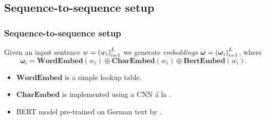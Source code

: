 \documentclass[8pt]{beamer}
\theoremstyle{definition}
\theoremstyle{plain}
\theoremstyle{definition}
\theoremstyle{remark}
\numberwithin{equation}{section}
\numberwithin{figure}{section}
\numberwithin{table}{section}
\begin{document}
\subsection{Sequence-to-sequence setup}
\begin{frame}
    \frametitle{Sequence-to-sequence setup}
    Given an input sentence \(w = \qty(w_{i})_{i=1}^{L}\) we generate \textit{embeddings} \(\boldsymbol{\omega} = \qty(\boldsymbol{\omega}_{i})_{i=1}^{L}\), where
    \[
        \boldsymbol{\omega}_{i} = \mathbf{WordEmbed}(w_{i}) \oplus \mathbf{CharEmbed}(w_{i}) \oplus \mathbf{BertEmbed}(w_{i}).
    \]
    \pause
    \begin{itemize}[<+->]
        \item \(\mathbf{WordEmbed}\) is a simple lookup table.
        \item \(\mathbf{CharEmbed}\) is implemented using a CNN á la \textcite{chiu2016named}.
        \item BERT model pre-trained on German text by \textcite{bert-base-german-cased}.
    \end{itemize}


\end{frame}
\end{document}
